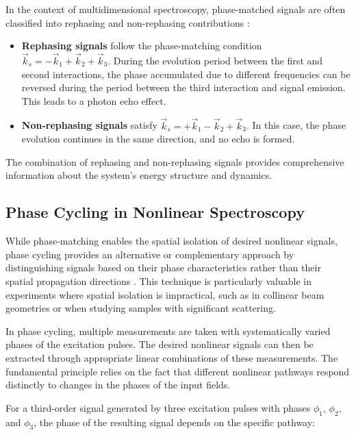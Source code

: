 \noindent In the context of multidimensional spectroscopy, phase-matched signals are often classified into rephasing and non-rephasing contributions \cite{Cho2009, Jonas2003}:

\begin{itemize}
    \item \textbf{Rephasing signals} follow the phase-matching condition $\vec{k}_s = -\vec{k}_1 + \vec{k}_2 + \vec{k}_3$. During the evolution period between the first and second interactions, the phase accumulated due to different frequencies can be reversed during the period between the third interaction and signal emission. This leads to a photon echo effect.

    \item \textbf{Non-rephasing signals} satisfy $\vec{k}_s = +\vec{k}_1 - \vec{k}_2 + \vec{k}_3$. In this case, the phase evolution continues in the same direction, and no echo is formed.
\end{itemize}

\noindent The combination of rephasing and non-rephasing signals provides comprehensive information about the system's energy structure and dynamics.

\subsection{Phase Cycling in Nonlinear Spectroscopy}
\label{subsec:phase_cycling}

\noindent While phase-matching enables the spatial isolation of desired nonlinear signals, phase cycling provides an alternative or complementary approach by distinguishing signals based on their phase characteristics rather than their spatial propagation directions \cite{Tan2008, Yan2009}. This technique is particularly valuable in experiments where spatial isolation is impractical, such as in collinear beam geometries or when studying samples with significant scattering.

\noindent In phase cycling, multiple measurements are taken with systematically varied phases of the excitation pulses. The desired nonlinear signals can then be extracted through appropriate linear combinations of these measurements. The fundamental principle relies on the fact that different nonlinear pathways respond distinctly to changes in the phases of the input fields.

\noindent For a third-order signal generated by three excitation pulses with phases $\phi_1$, $\phi_2$, and $\phi_3$, the phase of the resulting signal depends on the specific pathway:


